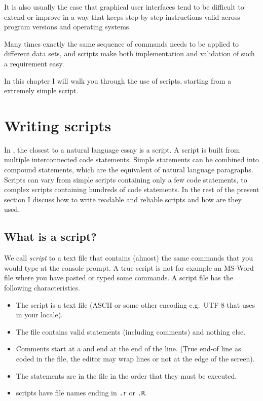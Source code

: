 \documentclass[krantz2]{krantz}\usepackage{knitr}%
\begin{document}
It is also usually the case that graphical user interfaces tend to be difficult to extend or improve in a way that keeps step-by-step instructions valid across program versions and operating systems.

Many times exactly the same sequence of commands needs to be applied to different data sets, and scripts make both implementation and validation of such a requirement easy.

In this chapter I will walk you through the use of \Rpgrm scripts, starting from a extremely simple script.

\section{Writing scripts}

In \Rlang, the closest to a natural language essay is a script. A script is built from multiple interconnected code statements. Simple statements can be combined into compound statements, which are the equivalent of natural language paragraphs. Scripts can vary from simple scripts containing only a few code statements, to complex scripts containing hundreds of code statements. In the rest of the present section I discuss how to write readable and reliable scripts and how are they used.

\subsection{What is a script?}\label{sec:script:what:is}
We call \textit{script} to a text file that contains (almost) the same commands that you would type at the console prompt. A true script is not for example an MS-Word file where you have pasted or typed some \Rlang commands. A script file has the following characteristics.
\begin{itemize}
  \item The script is a text file (ASCII or some other encoding e.g.\ UTF-8 that \Rpgrm uses in your locale).
  \item The file contains valid \Rlang statements (including comments) and nothing else.
  \item Comments start at a \code{\#} and end at the end of the line. (True end-of line as coded in the file, the editor may wrap lines or not at the edge of the screen).
  \item The \Rlang statements are in the file in the order that they must be executed.
  \item \Rlang scripts have file names ending in \texttt{.r} or \texttt{.R}.
\end{itemize}
\end{document}
